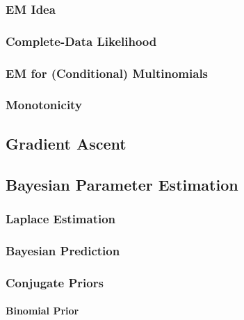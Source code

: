 			\subsubsection{EM Idea} %

			\subsubsection{Complete-Data Likelihood} %

			\subsubsection{EM for (Conditional) Multinomials} %

			\subsubsection{Monotonicity} %

		\subsection{Gradient Ascent} %

		\subsection{Bayesian Parameter Estimation} %

			\subsubsection{Laplace Estimation} %

			\subsubsection{Bayesian Prediction} %

			\subsubsection{Conjugate Priors} %

				\paragraph{Binomial Prior} %

